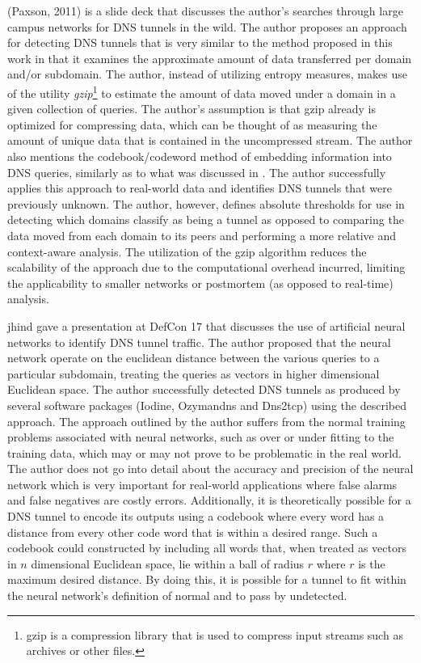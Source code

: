 \documentclass[12pt]{article}
\theoremstyle{remark}
\theoremstyle{definition}
\theoremstyle{definition}
\theoremstyle{definition}
\begin{document}
(Paxson, 2011)\cite{Paxson2011} is a slide deck that discusses the author's
searches through large campus networks for DNS tunnels in the wild. The author
proposes an approach for detecting DNS tunnels that is very similar to the
method proposed in this work in that it examines the approximate amount of data
transferred per domain and/or subdomain. The author, instead of utilizing
entropy measures, makes use of the utility \emph{gzip}\footnote{gzip is a
compression library that is used to compress input streams such as archives or
other files.} to estimate the amount of data moved under a domain in a given
collection of queries. The author's assumption is that gzip already is optimized
for compressing data, which can be thought of as measuring the amount of unique
data that is contained in the uncompressed stream. The author also mentions the
codebook/codeword method of embedding information into DNS queries, similarly as
to what was discussed in \cite{Butler2011}. The author successfully applies this
approach to real-world data and identifies DNS tunnels that were previously
unknown. The author, however, defines absolute thresholds for use in detecting
which domains classify as being a tunnel as opposed to comparing the data moved
from each domain to its peers and performing a more relative and context-aware
analysis. The utilization of the gzip algorithm reduces the scalability of the
approach due to the computational overhead incurred, limiting the applicability
to smaller networks or postmortem (as opposed to real-time) analysis.

jhind\cite{jhind2009} gave a presentation at DefCon 17 that discusses the use of
artificial neural networks to identify DNS tunnel traffic. The author proposed
that the neural network operate on the euclidean distance between the various
queries to a particular subdomain, treating the queries as vectors in higher
dimensional Euclidean space. The author successfully detected DNS tunnels as
produced by several software packages (Iodine, Ozymandns and Dns2tcp) using the
described approach. The approach outlined by the author suffers from the normal
training problems associated with neural networks, such as over or under fitting
to the training data, which may or may not prove to be problematic in the real
world. The author does not go into detail about the accuracy and precision of
the neural network which is very important for real-world applications where
false alarms and false negatives are costly errors. Additionally, it is
theoretically possible for a DNS tunnel to encode its outputs using a codebook
where every word has a distance from every other code word that is within a
desired range. Such a codebook could constructed by including all words that,
when treated as vectors in $n$ dimensional Euclidean space, lie within a ball of
radius $r$ where $r$ is the maximum desired distance. By doing this, it is
possible for a tunnel to fit within the neural network's definition of normal
and to pass by undetected.
\end{document}
